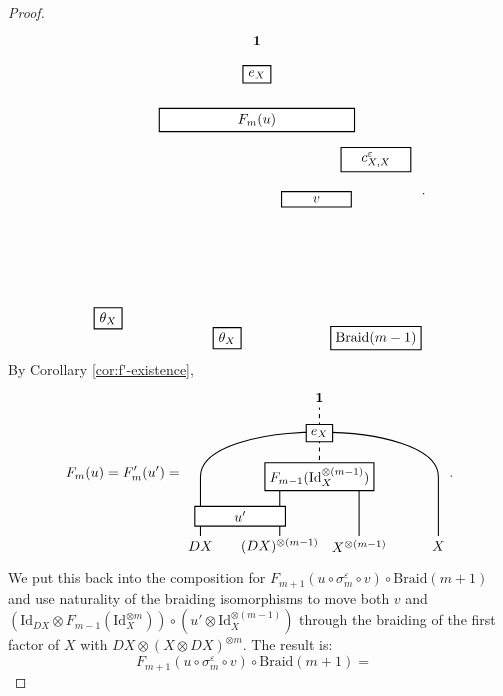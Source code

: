 \documentclass[11pt, reqno]{amsart}
\theoremstyle{definition}\newtheorem{defi}[thm]{Definition}
\theoremstyle{definition}\newtheorem{rem}[thm]{Remark}
\theoremstyle{definition}\newtheorem{exam}[thm]{Example}
\theoremstyle{definition}\newtheorem{assum}[thm]{Assumption}
\newcommand{\Id}{\mathrm{Id}}
\newcommand{\vac}{\mathbf{1}}
\begin{document}
\begin{proof}
\begin{align*}
\begin{matrix}
\begin{tikzpicture}[scale = 1, baseline = {(current bounding box.center)}, line width=0.75pt]
    \node at (0,1) [draw,minimum width=20pt,minimum height=10pt,thick, fill=white] {$\theta_{X}$};
    \node at (3,.5) [draw,minimum width=20pt,minimum height=10pt,thick, fill=white] {$\theta_{X}$};
    \node at (6.75,.5) [draw,minimum width=20pt,minimum height=10pt,thick, fill=white] {$\mathrm{Braid}(m-1)$};
    \node at (5.25,4) [draw,minimum width=50pt,minimum height=10pt,thick, fill=white] {$v$};
    \node at (6.75,5) [draw,minimum width=50pt,minimum height=10pt,thick, fill=white] {$c_{X,X}^{\varepsilon}$};
     \node at (3.75,6) [draw,minimum width=140pt,minimum height=10pt,thick, fill=white] {$F_{m}(u)$};
      \node at (3.75,7.15) [draw,minimum width=20pt,minimum height=10pt,thick, fill=white] {$e_X$};
     \node at (3.75,8) {$\vac$};
    \end{tikzpicture}
    \end{matrix}.
\end{align*}
By Corollary \ref{cor:f'-existence},
\begin{equation*}
F_{m}(u) =F'_{m}(u') =\begin{matrix}
    \begin{tikzpicture}[scale = 1, baseline = {(current bounding box.center)}, line width=0.75pt]
        \draw (0,0) -- (0,1.5) .. controls (0,3) and (6,3) .. (6,1.5) -- (6,0);
        \draw (2,0) -- (2,1.5) -- (4,1.5) -- (4,0);
        \draw[dashed] (3,1.5) -- (3,3.25);
              \node at (3,2.6) [draw,minimum width=10pt,minimum height=10pt,thick, fill=white] {$e_X$};
      \node at (3,1.5) [draw,minimum width=10pt,minimum height=10pt,thick, fill=white] {$F_{m-1}(\Id_X^{\otimes (m-1)})$};
      \node at (1,.5) [draw,minimum width=65pt,minimum height=10pt,thick, fill=white] {$u'$};
      \node at (3,3.5) {$\vac$};
      \node at (0,-.25) {$DX$};
      \node at (2,-.25) {$(DX)^{\otimes(m-1)}$};
      \node at (4,-.25) {$X^{\otimes(m-1)}$};
      \node at (6,-.25) {$X$};
        \end{tikzpicture}
   \end{matrix}.
\end{equation*}
We put this back into the composition for $F_{m+1}(u\circ\sigma_m^\varepsilon\circ v)\circ\mathrm{Braid}(m+1)$ and use naturality of the braiding isomorphisms to move both $v$ and $(\Id_{DX}\otimes F_{m-1}(\Id_X^{\otimes m}))\circ(u'\otimes\Id_X^{\otimes (m-1)})$ through the braiding of the first factor of $X$ with $DX\otimes(X\otimes DX)^{\otimes m}$. The result is:
\begin{equation}\label{thm:main-thm-calc1}
F_{m+1}(u\circ\sigma_m^\varepsilon\circ v)\circ\mathrm{Braid}(m+1) =\begin{matrix}

\end{matrix}
\end{equation}
\end{proof}
\end{document}

